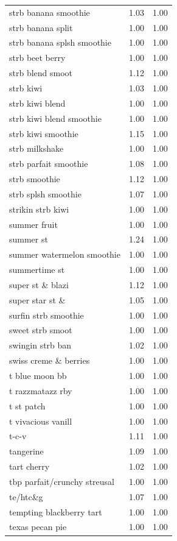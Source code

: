 \begin{table}
\begin{tabular}{lrr}
strb banana smoothie & 1.03 & 1.00 \\
strb banana split & 1.00 & 1.00 \\
strb banana splsh smoothie & 1.00 & 1.00 \\
strb beet berry & 1.00 & 1.00 \\
strb blend smoot & 1.12 & 1.00 \\
strb kiwi & 1.03 & 1.00 \\
strb kiwi blend & 1.00 & 1.00 \\
strb kiwi blend smoothie & 1.00 & 1.00 \\
strb kiwi smoothie & 1.15 & 1.00 \\
strb milkshake & 1.00 & 1.00 \\
strb parfait smoothie & 1.08 & 1.00 \\
strb smoothie & 1.12 & 1.00 \\
strb splsh smoothie & 1.07 & 1.00 \\
strikin strb kiwi & 1.00 & 1.00 \\
summer fruit & 1.00 & 1.00 \\
summer st & 1.24 & 1.00 \\
summer watermelon smoothie & 1.00 & 1.00 \\
summertime st & 1.00 & 1.00 \\
super st \& blazi & 1.12 & 1.00 \\
super star st \& & 1.05 & 1.00 \\
surfin strb smoothie & 1.00 & 1.00 \\
sweet strb smoot & 1.00 & 1.00 \\
swingin strb ban & 1.02 & 1.00 \\
swiss creme \& berries & 1.00 & 1.00 \\
t blue moon bb & 1.00 & 1.00 \\
t razzmatazz rby & 1.00 & 1.00 \\
t st patch & 1.00 & 1.00 \\
t vivacious vanill & 1.00 & 1.00 \\
t-c-v & 1.11 & 1.00 \\
tangerine & 1.09 & 1.00 \\
tart cherry & 1.02 & 1.00 \\
tbp parfait/crunchy streusal & 1.00 & 1.00 \\
te/htc\&g & 1.07 & 1.00 \\
tempting blackberry tart & 1.00 & 1.00 \\
texas pecan pie & 1.00 & 1.00 \\

\end{tabular}
\end{table}
